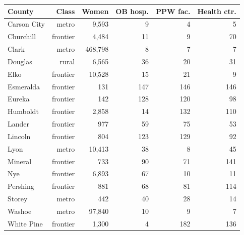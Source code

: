 \begin{tabular}{@{}lrrrrr@{}}
\toprule
County & Class & Women & OB hosp. & PPW fac. & Health ctr. \\
\midrule
Carson City & metro & 9{,}593 & 9 & 4 & 5 \\
Churchill & frontier & 4{,}484 & 11 & 9 & 70 \\
Clark & metro & 468{,}798 & 8 & 7 & 7 \\
Douglas & rural & 6{,}565 & 36 & 20 & 31 \\
Elko & frontier & 10{,}528 & 15 & 21 & 9 \\
Esmeralda & frontier & 131 & 147 & 146 & 146 \\
Eureka & frontier & 142 & 128 & 120 & 98 \\
Humboldt & frontier & 2{,}858 & 14 & 132 & 110 \\
Lander & frontier & 977 & 59 & 75 & 53 \\
Lincoln & frontier & 804 & 123 & 129 & 92 \\
Lyon & metro & 10{,}413 & 38 & 8 & 45 \\
Mineral & frontier & 733 & 90 & 71 & 141 \\
Nye & frontier & 6{,}893 & 67 & 10 & 11 \\
Pershing & frontier & 881 & 68 & 81 & 114 \\
Storey & metro & 442 & 40 & 28 & 14 \\
Washoe & metro & 97{,}840 & 10 & 9 & 7 \\
White Pine & frontier & 1{,}300 & 4 & 182 & 136 \\
\bottomrule
\end{tabular}
